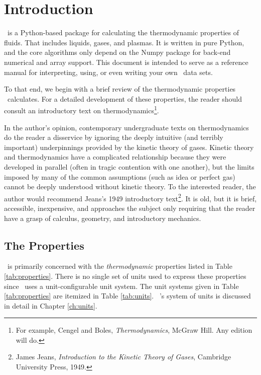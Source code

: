 \chapter{Introduction}

\PM\ is a Python-based package for calculating the thermodynamic properties of fluids.  That includes liquids, gases, and plasmas.  It is written in pure Python, and the core algorithms only depend on the Numpy package for back-end numerical and array support.  This document is intended to serve as a reference manual for interpreting, using, or even writing your own \PM\ data sets.  

To that end, we begin with a brief review of the thermodynamic properties \PM\ calculates.  For a detailed development of these properties, the reader should consult an introductory text on thermodynamics\footnote{For example, Cengel and Boles, \emph{Thermodynamics}, McGraw Hill.  Any edition will do.}.  

In the author's opinion, contemporary undergraduate texts on thermodynamics do the reader a disservice by ignoring the deeply intuitive (and terribly important) underpinnings provided by the kinetic theory of gases.  Kinetic theory and thermodynamics have a complicated relationship because they were developed in parallel (often in tragic contention with one another), but the limits imposed by many of the common assumptions (such as idea or perfect gas) cannot be deeply understood without kinetic theory.  To the interested reader, the author would recommend Jeans's 1949 introductory text\footnote{James Jeans, \emph{Introduction to the Kinetic Theory of Gases}, Cambridge University Press, 1949.}.  It is old, but it is brief, accessible, inexpensive, and approaches the subject only requiring that the reader have a grasp of calculus, geometry, and introductory mechanics.  

%
%
\section{The Properties}

\PM\ is primarily concerned with the \emph{thermodynamic} properties listed in Table \ref{tab:properties}.  There is no single set of units used to express these properties since \PM\ uses a unit-configurable unit system.  The unit systems given in Table \ref{tab:properties} are itemized in Table \ref{tab:units}.  \PM\ 's system of units is discussed in detail in Chapter \ref{ch:units}.

